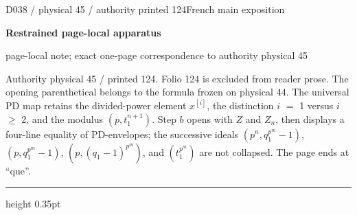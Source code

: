 \documentclass[9pt]{article}
\newcommand{\CanonText}[1]{\par{\fontsize{8.0}{9.35}\selectfont\RaggedRight #1\par}\vspace{2.2pt}}
\newcommand{\LayerTitle}{Restrained page-local apparatus}
\begin{document}
\noindent\begin{minipage}[t][\dimexpr\textheight-5pt\relax][t]{\textwidth}
{\sffamily\fontsize{7.3}{8.2}\selectfont\color{Quiet} D038 / physical 45 / authority printed 124\hfill French main exposition}
\par{}\vspace{4.5pt}
{\sffamily\fontsize{10.4}{11.6}\selectfont\bfseries\color{Accent} \LayerTitle}
\par{\sffamily\fontsize{6.7}{7.7}\selectfont\color{Quiet} page-local note; exact one-page correspondence to authority physical 45}
\vspace{5pt}
\CanonText{Authority physical 45 / printed 124. Folio 124 is excluded from reader prose. The opening parenthetical belongs to the formula frozen on physical 44. The universal PD map retains the divided-power element \(x^{[i]}\), the distinction \(i\) \(=\) 1 versus \(i\) \(\geq{}\) 2, and the modulus \((p,t_{1}^{n+1})\). Step \(b\) opens with \(Z\) and \(Z_{n}\), then displays a four-line equality of PD-envelopes; the successive ideals \((p^{n},q_{1}^{p^{m}}-1)\), \((p,q_{1}^{p^{m}}-1)\), \((p,(q_{1}-1)^{p^{m}})\), and \((t_{1}^{p^{m}})\) are not collapsed. The page ends at “que”.}
\vfill
{\color{Accent}\hrule height 0.35pt}\vspace{3pt}
\end{minipage}
\newpage
\end{document}
